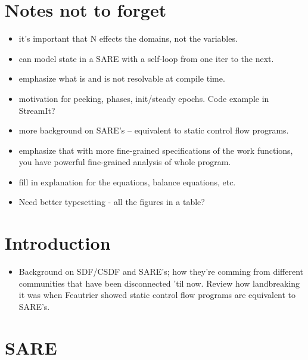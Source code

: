 \section{Notes not to forget}

\begin{itemize}

\item it's important that N effects the domains, not the variables.

\item can model state in a SARE with a self-loop from one iter to the next.

\item emphasize what is and is not resolvable at compile time.

\item motivation for peeking, phases, init/steady epochs.  Code
example in StreamIt?

\item more background on SARE's -- equivalent to static control flow
programs.

\item emphasize that with more fine-grained specifications of the work
functions, you have powerful fine-grained analysis of whole program.

\item fill in explanation for the equations, balance equations, etc.

\item Need better typesetting - all the figures in a table?

\end{itemize}

\section{Introduction}

\begin{itemize}

\item Background on SDF/CSDF and SARE's; how they're comming from
different communities that have been disconnected 'til now.  Review
how landbreaking it was when Feautrier showed static control flow
programs are equivalent to SARE's.

\end{itemize}

\section{SARE}

